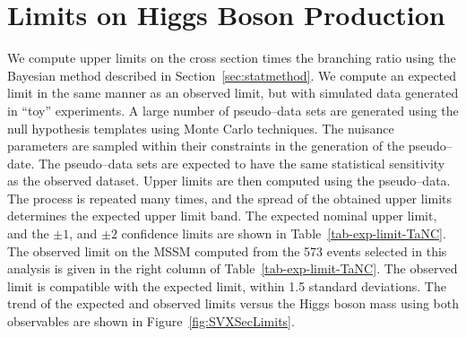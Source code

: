 \section{Limits on Higgs Boson Production}
We compute upper limits on the cross section times the branching ratio using the
Bayesian method described in Section~\ref{sec:statmethod}. We compute an
expected limit in the same manner as an observed limit, but with simulated data
generated in ``toy'' experiments.  A large number of pseudo--data sets are
generated using the null hypothesis templates using Monte Carlo techniques. The
nuisance parameters are sampled within their constraints in the generation of
the pseudo--date.  The pseudo--data sets are expected to have the same
statistical sensitivity as the observed dataset.  Upper limits are then
computed using the pseudo--data.  The process is repeated many times, and the
spread of the obtained upper limits determines the expected upper limit band.
The expected nominal upper limit, and the $\pm1$, and $\pm2$ confidence limits
are shown in Table~\ref{tab-exp-limit-TaNC}.  The observed limit on the MSSM
computed from the 573 events selected in this analysis is given in the right
column of Table~\ref{tab-exp-limit-TaNC}.  The observed limit is compatible with
the expected limit, within 1.5 standard deviations.  The trend of the expected
and observed limits versus the Higgs boson mass using both observables are shown in
Figure~\ref{fig:SVXSecLimits}.  
%
%
